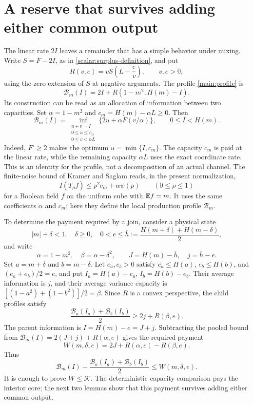 \section{A reserve that survives adding either common output}
\label{reserve:section}

The linear rate $2I$ leaves a remainder that has a simple behavior
under mixing.  Write $S=F-2I$, as in
\eqref{scalar:surplus-definition}, and put
\begin{equation}
 R(v,e)=vS\!\left(L-\frac ev\right),\qquad v,e>0,
 \label{reserve:perspective}
\end{equation}
using the zero extension of $S$ at negative arguments.  The profile
\eqref{main:profile} is
\[
 \mathcal B_m(I)=2I+R(1-m^2,H(m)-I).
\]
Its construction can be read as an allocation of information between
two capacities.  Set $\alpha=1-m^2$ and
$c_m=H(m)-\alpha L\ge0$.  Then
\begin{equation}
 \mathcal B_m(I)=
 \inf_{\substack{u+v=I\\0\le u\le c_m\\0\le v<\alpha L}}
 \{2u+\alpha F(v/\alpha)\},\qquad 0\le I<H(m).
 \label{reserve:allocation}
\end{equation}
Indeed, $F'\ge2$ makes the optimum $u=\min\{I,c_m\}$.
The capacity $c_m$ is paid at the linear rate, while the remaining
capacity $\alpha L$ uses the exact coordinate rate.  This is an
identity for the profile, not a decomposition of an actual channel.
The finite-noise bound of Kramer and Saglam
\cite[Theorem~1.1]{KramerSaglam2026} reads, in the present
normalization,
\[
 I(T_\rho f)\le\rho^2c_m+\alpha\psi(\rho)
 \qquad(0\le\rho\le1)
\]
for a Boolean field $f$ on the uniform cube with $\mathbb E f=m$.
It uses the same coefficients $\alpha$ and $c_m$; here they
define the local production profile $\mathcal B_m$.

To determine the payment required by a join, consider a physical state
\[
 |m|+\delta<1,\quad\delta\ge0,\quad
 0<e\le\bar h:=\frac{H(m+\delta)+H(m-\delta)}2,
\]
and write
\[
 \alpha=1-m^2,\quad\beta=\alpha-\delta^2,
 \qquad J=H(m)-\bar h,\quad j=\bar h-e.
\]
Set $a=m+\delta$ and $b=m-\delta$.  Let $e_a,e_b>0$ satisfy
$e_a\le H(a)$, $e_b\le H(b)$, and $(e_a+e_b)/2=e$, and put
$I_a=H(a)-e_a$, $I_b=H(b)-e_b$.  Their average information is
$j$, and their average variance capacity is
$[(1-a^2)+(1-b^2)]/2=\beta$.  Since $R$ is a convex
perspective, the child profiles satisfy
\begin{equation}
 \frac{\mathcal B_a(I_a)+\mathcal B_b(I_b)}2
 \ge2j+R(\beta,e).
 \label{reserve:pooling}
\end{equation}
The parent information is $I=H(m)-e=J+j$.  Subtracting the
pooled bound from $\mathcal B_m(I)=2(J+j)+R(\alpha,e)$ gives
the required payment
\begin{equation}
 W(m,\delta,e)=2J+R(\alpha,e)-R(\beta,e).
 \label{reserve:payment}
\end{equation}
Thus
\[
 \mathcal B_m(I)-\frac{\mathcal B_a(I_a)+\mathcal B_b(I_b)}2
 \le W(m,\delta,e).
\]
It is enough to prove $W\le\mathcal K$.  The deterministic
capacity comparison pays the interior core; the next two lemmas
show that this payment survives adding either common output.

